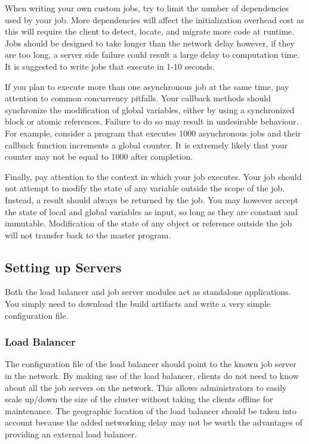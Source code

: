 When writing your own custom jobs, try to limit the number of
dependencies used by your job.
More dependencies will affect the initialization overhead cost
as this will require the client to detect, locate, and migrate
more code at runtime.
Jobs should be designed to take longer than the network
delay however, if they are too long, a server side failure
could result a large delay to computation time.
It is suggested to write jobs that execute in 1-10 seconds.

If you plan to execute more than one asynchronous job at the
same time, pay attention to common concurrency pitfalls.
Your callback methods should synchronize the modification
of global variables, either by using a synchronized block or
atomic references.
Failure to do so may result in undesirable behaviour.
For example, consider a program that executes 1000 asynchronous
jobs and their callback function increments a global counter.
It is extremely likely that your counter may not be equal to 1000
after completion.

Finally, pay attention to the context in which your job executes.
Your job should not attempt to modify the state of any variable
outside the scope of the job.
Instead, a result should always be returned by the job.
You may however accept the state of local and global variables
as input, so long as they are constant and immutable.
Modification of the state of any object or reference outside the job
will not transfer back to the master program.

\subsection{Setting up Servers}\label{subsec:settingUpServers}

Both the load balancer and job server modules act as standalone
applications.
You simply need to download the build artifacts and write
a very simple configuration file.


\subsubsection{Load Balancer}

The configuration file of the load balancer should point
to the known job server in the network.
By making use of the load balancer, clients do not
need to know about all the job servers on the network.
This allows administrators to easily scale up/down the
size of the cluster without taking the clients offline for
maintenance.
The geographic location of the load balancer should
be taken into account because the added networking delay
may not be worth the advantages of providing an external
load balancer.

